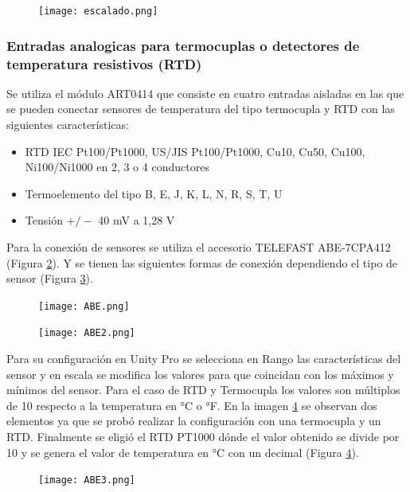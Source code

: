 \begin{figure}[H]
	\centering
	\texttt{[image: escalado.png]}
	\label{fig:escalado}
\end{figure}


\subsubsection{Entradas analogicas para termocuplas o detectores de temperatura resistivos (RTD)}
Se utiliza el módulo ART0414 que consiste en cuatro entradas aisladas en las que se pueden conectar sensores de temperatura del tipo termocupla y RTD con las siguientes características:
\begin{itemize}
	\item RTD IEC Pt100/Pt1000, US/JIS Pt100/Pt1000, Cu10, Cu50, Cu100, Ni100/Ni1000 en 2, 3 o 4 conductores
	\item Termoelemento del tipo B, E, J, K, L, N, R, S, T, U
\item 	Tensión $+/-$ 40 mV a 1,28 V
	
\end{itemize}

Para la conexión de sensores se utiliza el accesorio TELEFAST ABE-7CPA412 (Figura \ref{fig:ABE}). Y se tienen las siguientes formas de conexión dependiendo el tipo de sensor (Figura \ref{fig:ABE2}).

\begin{figure}[H]
	\centering
	\texttt{[image: ABE.png]}
	\label{fig:ABE}
\end{figure}
\begin{figure}[H]
	\centering
	\texttt{[image: ABE2.png]}
	\label{fig:ABE2}
\end{figure}

Para su configuración en Unity Pro se selecciona en Rango las características del sensor y en escala se modifica los valores para que coincidan con los máximos y mínimos del sensor. Para el caso de RTD y Termocupla los valores son múltiplos de 10 respecto a la temperatura en °C o °F. 
En la imagen \ref{fig:ABE3} se observan dos elementos ya que se probó realizar la configuración con una termocupla y un RTD. Finalmente se eligió el RTD PT1000 dónde el valor obtenido se divide por 10 y se genera el valor de temperatura en °C con un decimal  (Figura \ref{fig:ABE3}).

\begin{figure}[H]
	\centering
	\texttt{[image: ABE3.png]}
	\label{fig:ABE3}
\end{figure}

